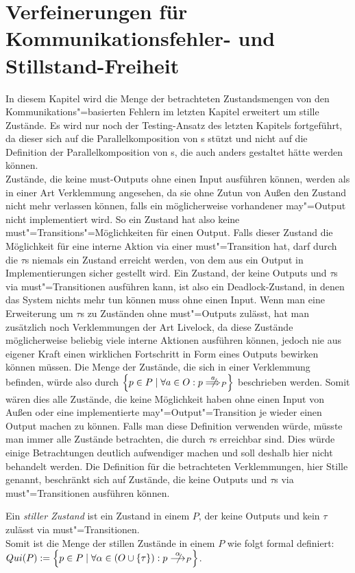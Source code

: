 \chapter{Verfeinerungen für Kommunikationsfehler- und Stillstand-Freiheit}

In diesem Kapitel wird die Menge der betrachteten Zustandsmengen von den
Kommunikations"=basierten Fehlern im letzten Kapitel erweitert um
stille Zustände. Es wird nur noch der Testing-Ansatz des letzten Kapitels
fortgeführt, da dieser sich auf die Parallelkomposition von \EIO{}s stützt und
nicht auf die Definition der Parallelkomposition von \MEIO{}s, die auch anders
gestaltet hätte werden können.\\
Zustände, die keine must-Outputs ohne einen Input ausführen können, werden als
in einer Art Verklemmung angesehen, da sie ohne Zutun von Außen den Zustand
nicht mehr verlassen können, falls ein möglicherweise vorhandener may"=Output
nicht implementiert wird. So ein Zustand hat also keine
must"=Transitions"=Möglichkeiten für einen Output. Falls dieser Zustand die
Möglichkeit für eine interne Aktion via einer must"=Transition hat, darf durch
die $\tau$s niemals ein Zustand erreicht werden, von dem aus ein Output in
Implementierungen sicher gestellt wird. Ein Zustand, der keine Outputs und
$\tau$s via must"=Transitionen ausführen kann, ist also ein Deadlock-Zustand,
in denen das System nichts mehr tun können muss ohne einen Input. Wenn man eine
Erweiterung um $\tau$s zu Zuständen ohne must"=Outputs zulässt, hat man
zusätzlich noch Verklemmungen der Art Livelock, da diese Zustände
möglicherweise beliebig viele interne Aktionen ausführen können, jedoch nie aus
eigener Kraft einen wirklichen Fortschritt in Form eines Outputs bewirken
können müssen. Die Menge der Zustände, die sich in einer Verklemmung
befinden, würde also durch $\left\{p\in P\mid \forall a\in O: p\nweakmust[a]_P
\right\}$ beschrieben werden. Somit wären dies alle Zustände, die keine
Möglichkeit haben ohne einen Input von Außen oder eine implementierte
may"=Output"=Transition je wieder einen Output machen zu können. Falls man
diese Definition verwenden würde, müsste man immer alle Zustände betrachten,
die durch $\tau$s erreichbar sind. Dies würde einige Betrachtungen deutlich
aufwendiger machen und soll deshalb hier nicht behandelt werden. Die Definition
für die betrachteten Verklemmungen, hier Stille genannt, beschränkt sich auf
Zustände, die keine Outputs und $\tau$s via must"=Transitionen ausführen
können.

\begin{Def}[Stillstand]
  Ein \emph{stiller Zustand} ist ein Zustand in einem \MEIO{} $P$, der keine
  Outputs und kein $\tau$ zulässt via must"=Transitionen.\\
  Somit ist die Menge der stillen Zustände in einem \MEIO{} $P$ wie folgt
  formal definiert: $Qui(P):=\left\{p\in P\mid \forall\alpha\in
  (O\cup\{\tau\}):p \nmust[\alpha]_P\right\}$.
\end{Def}

